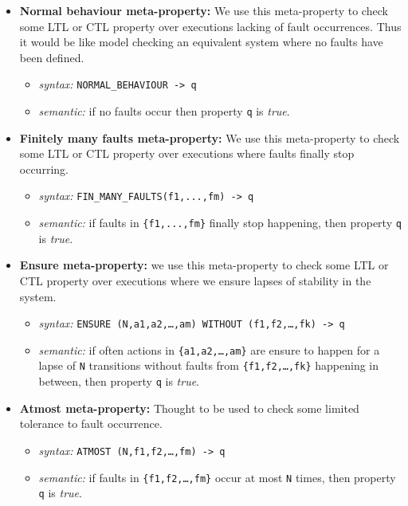 \documentclass[12pt]{llncs2e/llncs}
\begin{document}
\begin{itemize}
\item \textbf{Normal behaviour meta-property:} We use this meta-property to check some LTL or CTL property over executions lacking of fault occurrences. Thus it would be like model checking an equivalent system where no faults have been defined.
\begin{itemize}
\item \textit{syntax: } \texttt{NORMAL\_BEHAVIOUR -> q}
\item \textit{semantic: } if no faults occur then property \texttt{q} is \textit{true}.
\end{itemize}
\item \textbf{Finitely many faults meta-property:} We use this meta-property to check some LTL or CTL property over executions where faults finally stop occurring.
\begin{itemize}
\item \textit{syntax: } \texttt{FIN\_MANY\_FAULTS(f1,...,fm) -> q}
\item \textit{semantic: } if faults in \texttt{\{f1,...,fm\}} finally stop happening, then property \texttt{q} is \textit{true}.
\end{itemize}
\item \textbf{Ensure meta-property:} we use this meta-property to check some LTL or CTL property over executions where we ensure lapses of stability in the system.
\begin{itemize}
\item \textit{syntax: } \texttt{ENSURE (N,a1,a2,\ldots,am) WITHOUT (f1,f2,\ldots,fk) -> q}
\item \textit{semantic: } if often actions in \texttt{\{a1,a2,\ldots,am\}} are ensure to happen for a lapse of \texttt{N} transitions without faults from \texttt{\{f1,f2,\ldots,fk\}} happening in between, then property \texttt{q} is \textit{true}.
\end{itemize}
\item \textbf{Atmost meta-property:} Thought to be used to check some limited tolerance to fault occurrence.
\begin{itemize}
\item \textit{syntax: } \texttt{ATMOST (N,f1,f2,\ldots,fm) -> q}
\item \textit{semantic: } if faults in \texttt{\{f1,f2,\ldots,fm\}} occur at most \texttt{N} times, then property \texttt{q} is \textit{true}.
\end{itemize}
\end{itemize}
\end{document}
